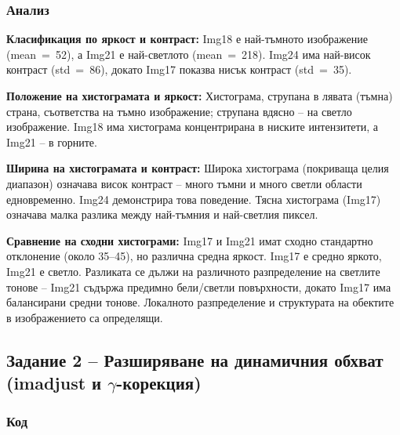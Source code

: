 \subsubsection{Анализ}

\textbf{Класификация по яркост и контраст:} Img18 е най-тъмното изображение (mean~=~52), а Img21 е най-светлото (mean~=~218). Img24 има най-висок контраст (std~=~86), докато Img17 показва нисък контраст (std~=~35).

\textbf{Положение на хистограмата и яркост:} Хистограма, струпана в лявата (тъмна) страна, съответства на тъмно изображение; струпана вдясно – на светло изображение. Img18 има хистограма концентрирана в ниските интензитети, а Img21 – в горните.

\textbf{Ширина на хистограмата и контраст:} Широка хистограма (покриваща целия диапазон) означава висок контраст – много тъмни и много светли области едновременно. Img24 демонстрира това поведение. Тясна хистограма (Img17) означава малка разлика между най-тъмния и най-светлия пиксел.

\textbf{Сравнение на сходни хистограми:} Img17 и Img21 имат сходно стандартно отклонение (около 35–45), но различна средна яркост. Img17 е средно яркото, Img21 е светло. Разликата се дължи на различното разпределение на светлите тонове – Img21 съдържа предимно бели/светли повърхности, докато Img17 има балансирани средни тонове. Локалното разпределение и структурата на обектите в изображението са определящи.

\subsection{Задание 2 – Разширяване на динамичния обхват (imadjust и $\gamma$-корекция)}

\subsubsection{Код}

